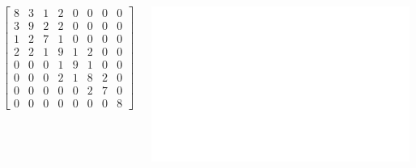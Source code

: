 \documentclass[xcolor=x11names,compress]{beamer}
\makeatletter
\let\beamer@writeslidentry@miniframeson=\beamer@writeslidentry
\newcommand*{\miniframeson}{\let\beamer@writeslidentry=\beamer@writeslidentry@miniframeson}
\makeatother
\begin{document}
\begin{frame}
	\vspace{2.5cm}
	\begin{columns}
		\[
			\begin{bmatrix}
				8 & 3 & 1 & 2 & 0 & 0 & 0 & 0 \\
				3 & 9 & 2 & 2 & 0 & 0 & 0 & 0 \\
				1 & 2 & 7 & 1 & 0 & 0 & 0 & 0 \\
				2 & 2 & 1 & 9 & 1 & 2 & 0 & 0 \\
				0 & 0 & 0 & 1 & 9 & 1 & 0 & 0 \\
				0 & 0 & 0 & 2 & 1 & 8 & 2 & 0 \\
				0 & 0 & 0 & 0 & 0 & 2 & 7 & 0 \\
				0 & 0 & 0 & 0 & 0 & 0 & 0 & 8
			\end{bmatrix}
		\]
		\begin{center}
			\includegraphics[scale=0.6]{img/graph/peo_white.pdf}
		\end{center}
	\end{columns}
\end{frame}

\begin{frame}
\end{frame}

\miniframeson
\egroup


\end{document}
